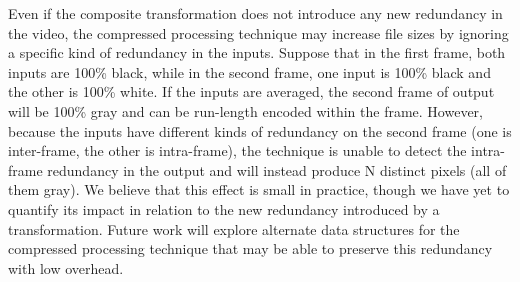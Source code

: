 Even if the composite transformation does not introduce any new
redundancy in the video, the compressed processing technique may
increase file sizes by ignoring a specific kind of redundancy in the
inputs.  Suppose that in the first frame, both inputs are 100\% black,
while in the second frame, one input is 100\% black and the other is
100\% white.  If the inputs are averaged, the second frame of output
will be 100\% gray and can be run-length encoded within the frame.
However, because the inputs have different kinds of redundancy on the
second frame (one is inter-frame, the other is intra-frame), the
technique is unable to detect the intra-frame redundancy in the output
and will instead produce N distinct pixels (all of them gray).  We
believe that this effect is small in practice, though we have yet to
quantify its impact in relation to the new redundancy introduced by a
transformation.  Future work will explore alternate data structures
for the compressed processing technique that may be able to preserve
this redundancy with low overhead.
